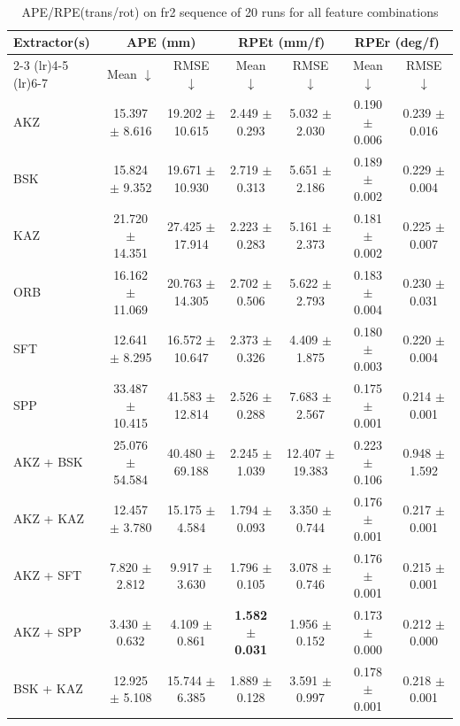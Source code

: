 \begin{table}[hbp]
\centering
\caption{APE/RPE(trans/rot) on fr2 sequence of 20 runs for all feature combinations}
\scriptsize
\label{tab:fr2_ape_rpe}\
\setlength{\tabcolsep}{3pt}
\begin{tabular}{lcccccc}
\toprule
\textbf{Extractor(s)}
& \multicolumn{2}{c}{\textbf{APE (mm)}}
& \multicolumn{2}{c}{\textbf{RPEt (mm/f)}}
& \multicolumn{2}{c}{\textbf{RPEr (deg/f)}} \\
\cmidrule(lr){2-3} \cmidrule(lr){4-5} \cmidrule(lr){6-7}
& Mean $\downarrow$ & RMSE $\downarrow$
& Mean $\downarrow$ & RMSE $\downarrow$
& Mean $\downarrow$ & RMSE $\downarrow$ \\
\midrule
AKZ & 15.397 $\pm$ 8.616 & 19.202 $\pm$ 10.615 & 2.449 $\pm$ 0.293 & 5.032 $\pm$ 2.030 & 0.190 $\pm$ 0.006 & 0.239 $\pm$ 0.016 \\
BSK & 15.824 $\pm$ 9.352 & 19.671 $\pm$ 10.930 & 2.719 $\pm$ 0.313 & 5.651 $\pm$ 2.186 & 0.189 $\pm$ 0.002 & 0.229 $\pm$ 0.004 \\
KAZ & 21.720 $\pm$ 14.351 & 27.425 $\pm$ 17.914 & 2.223 $\pm$ 0.283 & 5.161 $\pm$ 2.373 & 0.181 $\pm$ 0.002 & 0.225 $\pm$ 0.007 \\
ORB & 16.162 $\pm$ 11.069 & 20.763 $\pm$ 14.305 & 2.702 $\pm$ 0.506 & 5.622 $\pm$ 2.793 & 0.183 $\pm$ 0.004 & 0.230 $\pm$ 0.031 \\
SFT & 12.641 $\pm$ 8.295 & 16.572 $\pm$ 10.647 & 2.373 $\pm$ 0.326 & 4.409 $\pm$ 1.875 & 0.180 $\pm$ 0.003 & 0.220 $\pm$ 0.004 \\
SPP & 33.487 $\pm$ 10.415 & 41.583 $\pm$ 12.814 & 2.526 $\pm$ 0.288 & 7.683 $\pm$ 2.567 & 0.175 $\pm$ 0.001 & 0.214 $\pm$ 0.001 \\
AKZ + BSK & 25.076 $\pm$ 54.584 & 40.480 $\pm$ 69.188 & 2.245 $\pm$ 1.039 & 12.407 $\pm$ 19.383 & 0.223 $\pm$ 0.106 & 0.948 $\pm$ 1.592 \\
AKZ + KAZ & 12.457 $\pm$ 3.780 & 15.175 $\pm$ 4.584 & 1.794 $\pm$ 0.093 & 3.350 $\pm$ 0.744 & 0.176 $\pm$ 0.001 & 0.217 $\pm$ 0.001 \\
AKZ + SFT & 7.820 $\pm$ 2.812 & 9.917 $\pm$ 3.630 & 1.796 $\pm$ 0.105 & 3.078 $\pm$ 0.746 & 0.176 $\pm$ 0.001 & 0.215 $\pm$ 0.001 \\
AKZ + SPP & 3.430 $\pm$ 0.632 & 4.109 $\pm$ 0.861 & \textbf{1.582 $\pm$ 0.031} & 1.956 $\pm$ 0.152 & 0.173 $\pm$ 0.000 & 0.212 $\pm$ 0.000 \\
BSK + KAZ & 12.925 $\pm$ 5.108 & 15.744 $\pm$ 6.385 & 1.889 $\pm$ 0.128 & 3.591 $\pm$ 0.997 & 0.178 $\pm$ 0.001 & 0.218 $\pm$ 0.001 \\

\end{tabular}
\end{table}
